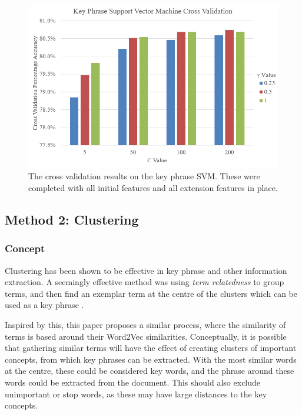\begin{center}
	\begin{figure}
		\includegraphics[width=\textwidth]{img/kpsvmcrossvalidation.png}
		\caption[Key Phrase SVM Cross Validation]{The cross validation results on the key phrase SVM. These were completed with all initial features and all extension features in place.}
		\label{figure:kpsvmcv}
	\end{figure}
\end{center}

\subsection{Method 2: Clustering}
\subsubsection*{Concept}
Clustering has been shown to be effective in key phrase and other information extraction. A seemingly effective method was using \textit{term relatedness} to group terms, and then find an exemplar term at the centre of the clusters which can be used as a key phrase \cite{Liu2009}. 

Inspired by this, this paper proposes a similar process, where the similarity of terms is based around their Word2Vec similarities. Conceptually, it is possible that gathering similar terms will have the effect of creating clusters of important concepts, from which key phrases can be extracted. With the most similar words at the centre, these could be considered key words, and the phrase around these words could be extracted from the document. This should also exclude unimportant or stop words, as these may have large distances to the key concepts. 

